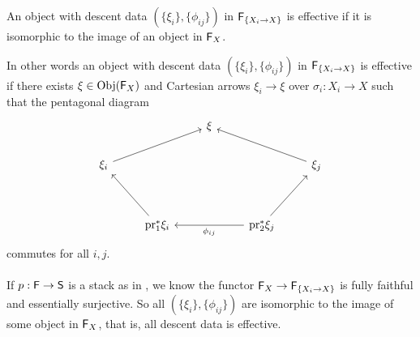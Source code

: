 \begin{definition}\label{def: effective descent data}
    An object with descent data $(\{\xi_{i}\},\{\phi_{ij}\})$ in $\mathsf{F}_{\{X_{i}\to X\}}$ is effective if it is isomorphic to the image of an object in $\mathsf{F}_{X}$. 
\end{definition} 
In other words an object with descent data $(\{\xi_{i}\},\{\phi_{ij}\})$ in $\mathsf{F}_{\{X_{i}\to X\}}$ is effective if there exists $\xi\in\mathrm{Obj}(\mathsf{F}_{X})$ and Cartesian arrows $\xi_{i}\to\xi$ over $\sigma_{i}:X_{i}\to X$ such that the pentagonal diagram 
$$%
\begin{tikzcd}
	&& \xi \\
	{\xi_{i}} & {} &&& {\xi_{j}} \\
	\\
	& {\pr_{1}^{*}\xi_{i}} && {\pr_{2}^{*}\xi_{j}}
	\arrow[from=2-1, to=1-3]
	\arrow[from=2-5, to=1-3]
	\arrow[from=4-2, to=2-1]
	\arrow[from=4-4, to=2-5]
	\arrow["{\phi_{ij}}", from=4-4, to=4-2]
\end{tikzcd}$$
commutes for all $i,j$.  
\\\\
If $p:\mathsf{F}\to\mathsf{S}$ is a stack as in , we know the functor $\mathsf{F}_{X}\to\mathsf{F}_{\{X_{i}\to X\}}$ is fully faithful and essentially surjective. So all $(\{\xi_{i}\},\{\phi_{ij}\})$ are isomorphic to the image of some object in $\mathsf{F}_{X}$, that is, all descent data is effective. 
